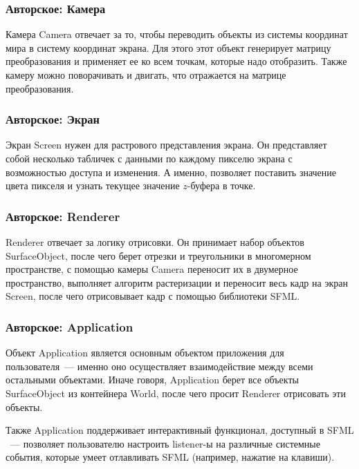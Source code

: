 \documentclass{article}
\begin{document}
\subsubsection{Авторское: Камера}

Камера Camera отвечает за то, чтобы переводить объекты из системы координат мира в систему координат экрана. Для этого этот объект генерирует матрицу преобразования и применяет ее ко всем точкам, которые надо отобразить. Также камеру можно поворачивать и двигать, что отражается на матрице преобразования.

\subsubsection{Авторское: Экран}

Экран Screen нужен для растрового представления экрана. Он представляет собой несколько табличек с данными по каждому пикселю экрана с возможностью доступа и изменения. А именно, позволяет поставить значение цвета пикселя и узнать текущее значение $z$-буфера в точке.

\subsubsection{Авторское: Renderer}

Renderer отвечает за логику отрисовки. Он принимает набор объектов SurfaceObject, после чего берет отрезки и треугольники в многомерном пространстве, с помощью камеры Camera переносит их в двумерное пространство, выполняет алгоритм растеризации и переносит весь кадр на экран Screen, после чего отрисовывает кадр с помощью библиотеки SFML. 

\subsubsection{Авторское: Application}

Объект Application является основным объектом приложения для пользователя~--- именно оно осуществляет взаимодействие между всеми остальными объектами. Иначе говоря, Application берет все объекты SurfaceObject из контейнера World, после чего просит Renderer отрисовать эти объекты.

Также Application поддерживает интерактивный функционал, доступный в SFML ~--- позволяет пользователю настроить listener-ы на различные системные события, которые умеет отлавливать SFML (например, нажатие на клавиши).
\end{document}
